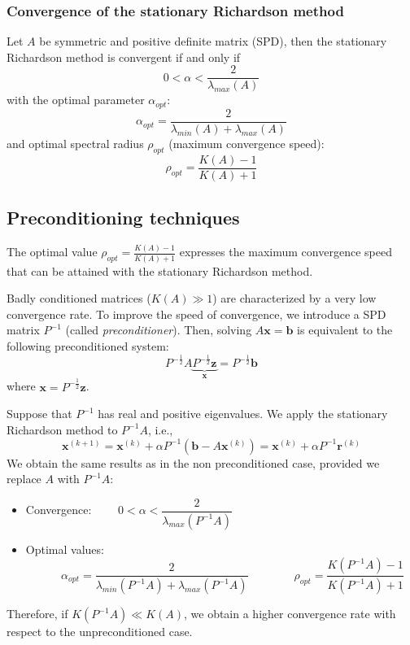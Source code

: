 \subsubsection{Convergence of the stationary Richardson method}

Let $A$ be symmetric and positive definite matrix (SPD),
then the stationary Richardson method is convergent if and only if
$$
    0 < \alpha < \frac{2}{\lambda_{max}(A)}
$$
with the optimal parameter $\alpha_{opt}$:
$$\alpha_{opt} = \frac{2}{\lambda_{min}(A) + \lambda_{max}(A)}$$
and optimal spectral radius $\rho_{opt}$ (maximum convergence speed):
$$
    \rho_{opt} = \frac{K(A) - 1}{K(A) + 1}
$$

\subsection{Preconditioning techniques}

The optimal value $\rho_{opt} = \frac{K(A) - 1}{K(A) + 1}$ expresses the maximum convergence speed that can be attained with the stationary Richardson method.

Badly conditioned matrices ($K(A) \gg 1$) are characterized by a very low convergence rate.
To improve the speed of convergence, we introduce a SPD matrix $P^{-1}$ (called \textit{preconditioner}). Then, solving $A \mathbf{x} = \mathbf{b}$ is equivalent to the following preconditioned system:
$$
    P^{-\frac{1}{2}} A \underbrace{P^{-\frac{1}{2}} \mathbf{z}}_{\mathbf{x}} =  P^{-\frac{1}{2}} \mathbf{b}
$$
where $\mathbf{x} = P^{-\frac{1}{2}} \mathbf{z}$.

Suppose that $P^{-1}$ has real and positive eigenvalues. We apply the stationary Richardson method to $P^{-1} A$, i.e.,
$$
    \mathbf{x}^{(k+1)} = \mathbf{x}^{(k)} + \alpha P^{-1}\left( \mathbf{b} - A \mathbf{x}^{(k)} \right) = \mathbf{x}^{(k)} + \alpha P^{-1} \mathbf{r}^{(k)}
$$
We obtain the same results as in the non preconditioned case, provided we replace $A$ with $P^{-1}A$:

\begin{itemize}
    \item Convergence: $\qquad0 < \alpha < \dfrac{2}{\lambda_{max}(P^{-1} A)}$
    \item Optimal values: $$\qquad \alpha_{opt} = \dfrac{2}{\lambda_{min}(P^{-1} A) + \lambda_{max}(P^{-1} A)} \qquad \qquad \rho_{opt} = \dfrac{K(P^{-1}A) - 1}{K(P^{-1} A) + 1}$$
\end{itemize}

Therefore, if $K(P^{-1} A) \ll K(A)$, we obtain a higher convergence rate with respect to the unpreconditioned case.

